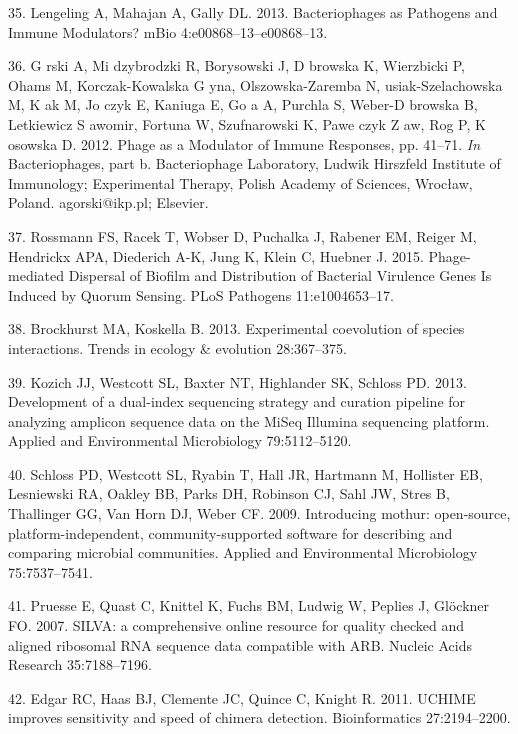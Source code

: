 \documentclass[12pt,]{article}
\begin{document}
\hypertarget{ref-Lengeling:2013ia}{}
35. Lengeling A, Mahajan A, Gally DL. 2013. Bacteriophages as Pathogens
and Immune Modulators? mBio 4:e00868--13--e00868--13.

\hypertarget{ref-Grski:2012fa}{}
36. G rski A, Mi dzybrodzki R, Borysowski J, D browska K, Wierzbicki P,
Ohams M, Korczak-Kowalska G yna, Olszowska-Zaremba N, usiak-Szelachowska
M, K ak M, Jo czyk E, Kaniuga E, Go a A, Purchla S, Weber-D browska B,
Letkiewicz S awomir, Fortuna W, Szufnarowski K, Pawe czyk Z aw, Rog P, K
osowska D. 2012. Phage as a Modulator of Immune Responses, pp. 41--71.
\emph{In} Bacteriophages, part b. Bacteriophage Laboratory, Ludwik
Hirszfeld Institute of Immunology; Experimental Therapy, Polish Academy
of Sciences, Wrocław, Poland. agorski@ikp.pl; Elsevier.

\hypertarget{ref-Rossmann:2015cj}{}
37. Rossmann FS, Racek T, Wobser D, Puchalka J, Rabener EM, Reiger M,
Hendrickx APA, Diederich A-K, Jung K, Klein C, Huebner J. 2015.
Phage-mediated Dispersal of Biofilm and Distribution of Bacterial
Virulence Genes Is Induced by Quorum Sensing. PLoS Pathogens
11:e1004653--17.

\hypertarget{ref-Brockhurst:2013iq}{}
38. Brockhurst MA, Koskella B. 2013. Experimental coevolution of species
interactions. Trends in ecology \& evolution 28:367--375.

\hypertarget{ref-Kozich:2013db}{}
39. Kozich JJ, Westcott SL, Baxter NT, Highlander SK, Schloss PD. 2013.
Development of a dual-index sequencing strategy and curation pipeline
for analyzing amplicon sequence data on the MiSeq Illumina sequencing
platform. Applied and Environmental Microbiology 79:5112--5120.

\hypertarget{ref-Schloss:2009do}{}
40. Schloss PD, Westcott SL, Ryabin T, Hall JR, Hartmann M, Hollister
EB, Lesniewski RA, Oakley BB, Parks DH, Robinson CJ, Sahl JW, Stres B,
Thallinger GG, Van Horn DJ, Weber CF. 2009. Introducing mothur:
open-source, platform-independent, community-supported software for
describing and comparing microbial communities. Applied and
Environmental Microbiology 75:7537--7541.

\hypertarget{ref-Pruesse:2007jc}{}
41. Pruesse E, Quast C, Knittel K, Fuchs BM, Ludwig W, Peplies J,
Glöckner FO. 2007. SILVA: a comprehensive online resource for quality
checked and aligned ribosomal RNA sequence data compatible with ARB.
Nucleic Acids Research 35:7188--7196.

\hypertarget{ref-Edgar:2011gy}{}
42. Edgar RC, Haas BJ, Clemente JC, Quince C, Knight R. 2011. UCHIME
improves sensitivity and speed of chimera detection. Bioinformatics
27:2194--2200.
\end{document}
